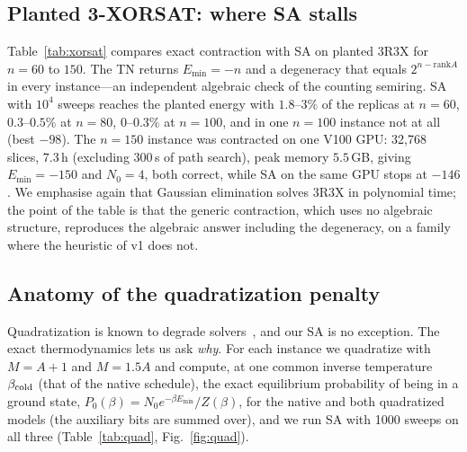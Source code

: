 \documentclass{article}
\newcommand{\Emin}{E_{\min}}
\newcommand{\N}{N_0}
\begin{document}
\subsection{Planted 3-XORSAT: where SA stalls}
\label{sec:exp-xorsat}
Table~\ref{tab:xorsat} compares exact contraction with SA on planted 3R3X for $n=60$ to $150$. The TN returns $\Emin=-n$ and a degeneracy that equals $2^{n-\mathrm{rank}A}$ in every instance---an independent algebraic check of the counting semiring. SA with $10^4$ sweeps reaches the planted energy with $1.8$--$3\%$ of the replicas at $n=60$, $0.3$--$0.5\%$ at $n=80$, $0$--$0.3\%$ at $n=100$, and in one $n=100$ instance not at all (best $-98$). The $n=150$ instance was contracted on one V100 GPU: 32{,}768 slices, $7.3$\,h (excluding 300\,s of path search), peak memory $5.5$\,GB, giving $\Emin=-150$ and $\N=4$, both correct, while SA on the same GPU stops at $-146$. We emphasise again that Gaussian elimination solves 3R3X in polynomial time; the point of the table is that the generic contraction, which uses no algebraic structure, reproduces the algebraic answer including the degeneracy, on a family where the heuristic of v1 does not.

\begin{table}[t]
\centering\small
\caption{Planted 3-regular 3-XORSAT. The TN degeneracy is checked against $2^{n-\mathrm{rank}_{\mathrm{GF}(2)}A}$. SA: 1024 replicas; $P(E_0)$ is the fraction of replicas that reach the planted energy. The $n=150$ instance ran on one V100 (\texttt{cotengra} search 300\,s, float32 energies, float64 counts). $^\dagger$width after slicing (the largest intermediate of one slice), which is why the $n=150$ value (26) is below the unsliced widths of Table~\ref{tab:reach}.}
\label{tab:xorsat}
\end{table}

\subsection{Anatomy of the quadratization penalty}
\label{sec:exp-quad}
Quadratization is known to degrade solvers~\cite{zec2026tnsat,salloum2026hubo,kanao2023sbhigher}, and our SA is no exception. The exact thermodynamics lets us ask \emph{why}. For each instance we quadratize with $M=A+1$ and $M=1.5A$ and compute, at one common inverse temperature $\beta_{\rm cold}$ (that of the native schedule), the exact equilibrium probability of being in a ground state, $P_0(\beta)=\N e^{-\beta\Emin}/Z(\beta)$, for the native and both quadratized models (the auxiliary bits are summed over), and we run SA with 1000 sweeps on all three (Table~\ref{tab:quad}, Fig.~\ref{fig:quad}).
\end{document}
